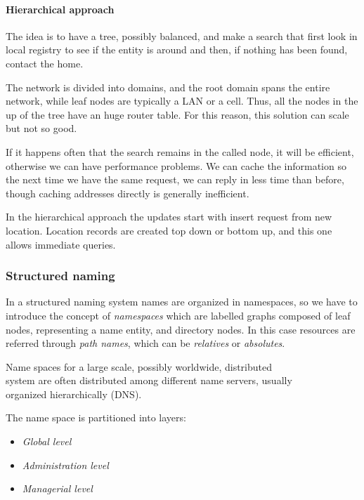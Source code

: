 \paragraph{Hierarchical approach}

The idea is to have a tree, possibly balanced, and make a search that
first look in local registry to see if the entity is around and then, if
nothing has been found, contact the home.

The network is divided into domains, and the root domain spans the
entire network, while leaf nodes are typically a LAN or a cell. Thus,
all the nodes in the up of the tree have an huge router table. For this
reason, this solution can scale but not so good.

If it happens often that the search remains in the called node, it will
be efficient, otherwise we can have performance problems. We can cache
the information so the next time we have the same request, we can reply
in less time than before, though caching addresses directly is generally
inefficient.

In the hierarchical approach the updates start with insert request from
new location. Location records are created top down or bottom up, and
this one allows immediate queries.

\subsubsection{Structured naming}

In a structured naming system names are organized in namespaces, so we
have to introduce the concept of \emph{namespaces} which are labelled
graphs composed of leaf nodes, representing a name entity, and directory
nodes. In this case resources are referred through \emph{path names},
which can be \emph{relatives} or \emph{absolutes}.

Name spaces for a large scale, possibly worldwide, distributed\\system
are often distributed among different name servers, usually\\organized
hierarchically (DNS).

The name space is partitioned into layers:

\begin{itemize}
    \item \emph{Global level}
    \item \emph{Administration level}
    \item \emph{Managerial level}
\end{itemize}

